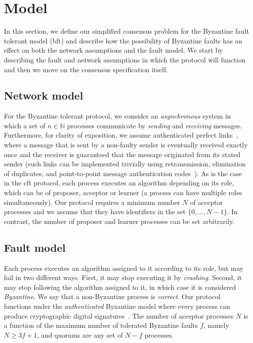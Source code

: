 \section{Model} \label{bft_model}

In this section, we define our simplified consensus problem for the Byzantine fault tolerant model (\acrshort{bft}) and describe how the possibility of Byzantine faults has an effect on both the network assumptions and the fault model. We start by describing the fault and network assumptions in which the protocol will function and then we move on the consensus specification itself.

\subsection{Network model}
For the Byzantine tolerant protocol, we consider an \emph{asynchronous} system in which a set of $n \in \mathbb{N}$ processes communicate by \emph{sending} and \emph{receiving} messages. Furthermore, for clarity of exposition, we assume authenticated perfect links~\cite{cgr:book}, where a message that is sent by a non-faulty sender is eventually received exactly once and the receiver is guaranteed that the message originated from its stated sender (such links can be implemented trivially using retransmission, elimination of duplicates, and point-to-point message authentication codes~\cite{cgr:book}). As is the case in the \acrshort{cft} protocol, each process executes an algorithm depending on its role, which can be of proposer, acceptor or learner (a process can have multiple roles simultaneously). Our protocol requires a minimum number $N$ of acceptor processes and we assume that they have identifiers in the set $\{0,...,N-1\}$. In contrast, the number of proposer and learner processes can be set arbitrarily.

\subsection{Fault model}
Each process executes an algorithm assigned to it according to its role, but may fail in two different ways. First, it may stop executing it by \emph{crashing}. Second, it may stop following the algorithm assigned to it, in which case it is considered \emph{Byzantine}. We say that a non-Byzantine process is \emph{correct}. Our protocol functions under the \emph{authenticated} Byzantine model where every process can produce cryptographic digital signatures~\cite{vukolic2012quorum}. The number of acceptor processes $N$ is a function of the maximum number of tolerated Byzantine faults $f$, namely $N \ge 3f+1$, and quorums are any set of $N-f$ processes. 

